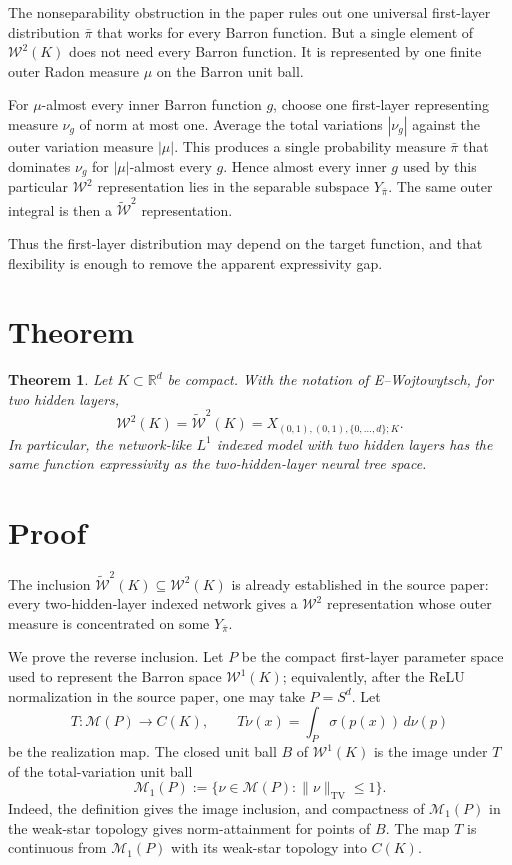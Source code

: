 \documentclass[11pt]{article}
\newcommand{\R}{\mathbb R}
\newcommand{\M}{\mathcal M}
\newcommand{\W}{\mathcal W}
\newcommand{\tW}{\widetilde{\mathcal W}}
\newcommand{\1}{\mathbf 1}
\newcommand{\TV}{\operatorname{TV}}
\newtheorem{theorem}{Theorem}
\begin{document}
The nonseparability obstruction in the paper rules out one universal first-layer distribution $\bar\pi$ that works for every Barron function.  But a single element of $\W^2(K)$ does not need every Barron function. It is represented by one finite outer Radon measure $\mu$ on the Barron unit ball.

For $\mu$-almost every inner Barron function $g$, choose one first-layer representing measure $\nu_g$ of norm at most one. Average the total variations $|\nu_g|$ against the outer variation measure $|\mu|$. This produces a single probability measure $\bar\pi$ that dominates $\nu_g$ for $|\mu|$-almost every $g$. Hence almost every inner $g$ used by this particular $\W^2$ representation lies in the separable subspace $Y_{\bar\pi}$. The same outer integral is then a $\tW^2$ representation.

Thus the first-layer distribution may depend on the target function, and that flexibility is enough to remove the apparent expressivity gap.

\section*{Theorem}

\begin{theorem}
Let $K\subset \R^d$ be compact. With the notation of E--Wojtowytsch, for two hidden layers,
\[
  \W^2(K)=\tW^2(K)
  =X_{(0,1),(0,1),\{0,\dots,d\};K}.
\]
In particular, the network-like $L^1$ indexed model with two hidden layers has the same function expressivity as the two-hidden-layer neural tree space.
\end{theorem}

\section*{Proof}

The inclusion $\tW^2(K)\subseteq \W^2(K)$ is already established in the source paper: every two-hidden-layer indexed network gives a $\W^2$ representation whose outer measure is concentrated on some $Y_{\bar\pi}$.

We prove the reverse inclusion. Let $P$ be the compact first-layer parameter space used to represent the Barron space $\W^1(K)$; equivalently, after the ReLU normalization in the source paper, one may take $P=S^d$. Let
\[
  T:\M(P)\longrightarrow C(K), \qquad
  T\nu(x)=\int_P \sigma(p(x))\,d\nu(p)
\]
be the realization map. The closed unit ball $B$ of $\W^1(K)$ is the image under $T$ of the total-variation unit ball
\[
  \M_1(P):=\{\nu\in \M(P): \|\nu\|_{\TV}\le 1\}.
\]
Indeed, the definition gives the image inclusion, and compactness of $\M_1(P)$ in the weak-star topology gives norm-attainment for points of $B$. The map $T$ is continuous from $\M_1(P)$ with its weak-star topology into $C(K)$.
\end{document}
